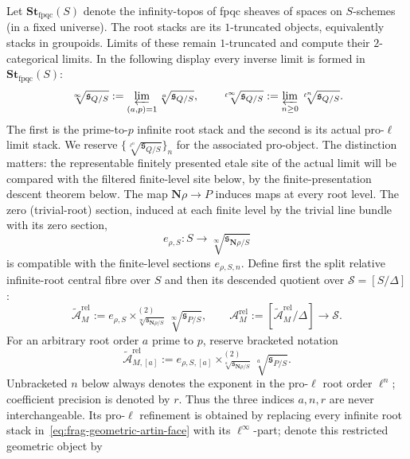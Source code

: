 \documentclass[11pt]{article}
\theoremstyle{definition}
\theoremstyle{remark}
\begin{document}
Let $\mathbf{St}_{\mathrm{fpqc}}(S)$ denote the infinity-topos of
fpqc sheaves of spaces on $S$-schemes (in a fixed universe).
The root stacks are its $1$-truncated objects, equivalently stacks
in groupoids.  Limits of these remain $1$-truncated and compute
their $2$-categorical limits.  In the following display every inverse limit is formed in
$\mathbf{St}_{\mathrm{fpqc}}(S)$:
\[
 \sqrt[\infty]{\mathfrak s_{Q/S}}
 :=\varprojlim_{(a,p)=1}\sqrt[a]{\mathfrak s_{Q/S}},
 \qquad
 \sqrt[\ell^\infty]{\mathfrak s_{Q/S}}
 :=\varprojlim_{n\geq0}\sqrt[\ell^n]{\mathfrak s_{Q/S}}.
\]
The first is the prime-to-$p$ infinite root stack and the second is its
actual pro-$\ell$ limit stack.  We reserve
$\{\sqrt[\ell^n]{\mathfrak s_{Q/S}}\}_n$ for the associated pro-object.
The distinction matters: the representable finitely presented etale site of
the actual limit will be compared with the filtered finite-level site below,
by the finite-presentation descent theorem below.  The map
$\mathbf N\rho\to P$ induces maps at every root
level.  The zero (trivial-root) section, induced at each finite level by the
trivial line bundle with its zero section,
\[
 e_{\rho,S}:S\longrightarrow
 \sqrt[\infty]{\mathfrak s_{\mathbf N\rho/S}}
\]
is compatible with the finite-level sections $e_{\rho,S,n}$.  Define first the
split relative infinite-root central fibre over $S$ and then its descended
quotient over $\mathscr S=[S/\Delta]$:
\begin{equation}
 \widetilde{\mathcal A}_M^{\mathrm{rel}}
 :=
 e_{\rho,S}\times^{(2)}_{\sqrt[\infty]{\mathfrak s_{\mathbf N\rho/S}}}
 \sqrt[\infty]{\mathfrak s_{P/S}},
 \qquad
 \boxed{\mathcal A_M^{\mathrm{rel}}
 :=[\widetilde{\mathcal A}_M^{\mathrm{rel}}/\Delta]
 \longrightarrow\mathscr S.}
 \label{eq:frag-geometric-artin-face}
\end{equation}
For an arbitrary root order $a$ prime to $p$, reserve bracketed notation
\begin{equation}
 \widetilde{\mathcal A}_{M,[a]}^{\mathrm{rel}}
 :=e_{\rho,S,[a]}
   \times^{(2)}_{\sqrt[a]{\mathfrak s_{\mathbf N\rho/S}}}
   \sqrt[a]{\mathfrak s_{P/S}}.
 \label{eq:frag-arbitrary-root-order}
\end{equation}
Unbracketed $n$ below always denotes the exponent in the pro-$\ell$ root
order $\ell^n$; coefficient precision is denoted by $r$.  Thus the three
indices $a,n,r$ are never interchangeable.
Its pro-$\ell$ refinement is obtained by replacing every infinite root stack
in~\eqref{eq:frag-geometric-artin-face} with its $\ell^\infty$-part; denote
this restricted geometric object by
\end{document}
